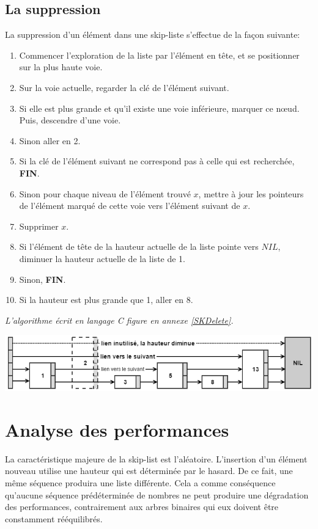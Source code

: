 \documentclass[hidelinks,a4paper, 12pt]{article}
\begin{document}
	\newpage
	\subsection{La suppression}
	La suppression d'un élément dans une skip-liste s'effectue de la façon suivante:
	\begin{enumerate}
		\item Commencer l'exploration de la liste par l'élément en tête, et se positionner sur la plus haute voie.
		\item Sur la voie actuelle, regarder la clé de l'élément suivant.
		\item Si elle est plus grande et qu'il existe une voie inférieure, marquer ce nœud. Puis, descendre d'une voie.
		\item Sinon aller en 2.
		\item Si la clé de l'élément suivant ne correspond pas à celle qui est recherchée, \textbf{FIN}.
		\item Sinon pour chaque niveau de l'élément trouvé $x$, mettre à jour les pointeurs de l'élément marqué de cette voie vers l'élément suivant de $x$.
		\item Supprimer $x$.
		\item Si l'élément de tête de la hauteur actuelle de la liste pointe vers $NIL$, diminuer la hauteur actuelle de la liste de 1.
		\item Sinon, \textbf{FIN}.
		\item Si la hauteur est plus grande que 1, aller en 8.
	\end{enumerate}
	\emph{L'algorithme écrit en langage C figure en annexe \ref{SKDelete}.}
	\begin{center}
		\includegraphics[width=\textwidth]{img/delete}
	\end{center}
	
	\newpage
	\section{Analyse des performances}\label{perf}
	La caractéristique majeure de la skip-list est l'aléatoire. L'insertion d'un élément nouveau utilise une hauteur qui est déterminée par le hasard. De ce fait, une même séquence produira une liste différente. Cela a comme conséquence qu'aucune séquence prédéterminée de nombres ne peut produire une dégradation des performances, contrairement aux arbres binaires qui eux doivent être constamment rééquilibrés.
	
\end{document}
